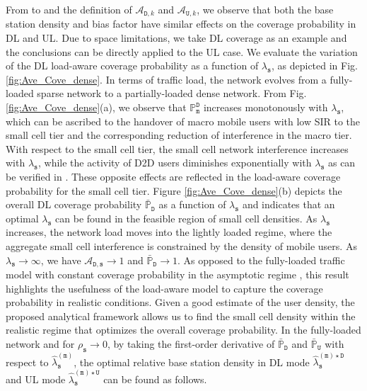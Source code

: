 \documentclass[twocolumn,english]{IEEEtran}
\theoremstyle{plain}
\theoremstyle{definition}
\begin{document}
From  to  and the definition
of $\mathcal{A}_{\mathtt{D},k}$ and $\mathcal{A}_{\mathtt{U},k}$,
we observe that both the base station density and bias factor have
similar effects on the coverage probability in DL and UL. Due to space
limitations, we take DL coverage as an example and the conclusions
can be directly applied to the UL case. We evaluate the variation
of the DL load-aware coverage probability as a function of $\lambda_{\mathtt{s}}$,
as depicted in Fig. \ref{fig:Ave_Cove_dense}. In terms of traffic
load, the network evolves from a fully-loaded sparse network to a
partially-loaded dense network. From Fig. \ref{fig:Ave_Cove_dense}(a),
we observe that $\mathbb{P}_{\mathtt{m}}^{\mathtt{D}}$ increases
monotonously with $\lambda_{\mathtt{s}}$, which can be ascribed to
the handover of macro mobile users with low SIR to the small cell
tier and the corresponding reduction of interference in the macro
tier. With respect to the small cell tier, the small cell network
interference increases with $\lambda_{\mathtt{s}}$, while the activity
of D2D users diminishes exponentially with $\lambda_{\mathtt{s}}$
as can be verified in . These opposite
effects are reflected in the load-aware coverage probability for the
small cell tier. Figure \ref{fig:Ave_Cove_dense}(b) depicts the overall
DL coverage probability $\bar{\mathbb{P}}_{\mathtt{D}}$ as a function
of $\lambda_{\mathtt{s}}$ and indicates that an optimal $\lambda_{\mathtt{s}}$
can be found in the feasible region of small cell densities. As $\lambda_{\mathtt{s}}$
increases, the network load moves into the lightly loaded regime,
where the aggregate small cell interference is constrained by the
density of mobile users. As $\lambda_{\mathtt{s}}\rightarrow\infty$,
we have $\mathcal{A}_{\mathtt{D},\mathtt{s}}\rightarrow1$ and $\bar{\mathbb{P}}_{\mathtt{D}}\rightarrow1$.
As opposed to the fully-loaded traffic model with constant coverage
probability in the asymptotic regime \cite{ATAT,MAKT}, this result
highlights the usefulness of the load-aware model to capture the coverage
probability in realistic conditions. Given a good estimate of the
user density, the proposed analytical framework allows us to find
the small cell density within the realistic regime that optimizes
the overall coverage probability. In the fully-loaded network and
for $\rho_{\mathtt{s}}\rightarrow0$, by taking the first-order derivative
of $\bar{\mathbb{P}}_{\mathtt{D}}$ and $\bar{\mathbb{P}}_{\mathtt{U}}$
with respect to $\hat{\lambda}_{\mathtt{s}}^{(\mathtt{m})}$, the
optimal relative base station density in DL mode $\hat{\lambda}_{\mathtt{s}}^{\mathtt{\left(m\right)\star D}}$
and UL mode $\hat{\lambda}_{\mathtt{s}}^{\mathtt{\left(m\right)\star U}}$
can be found as follows.
\end{document}
